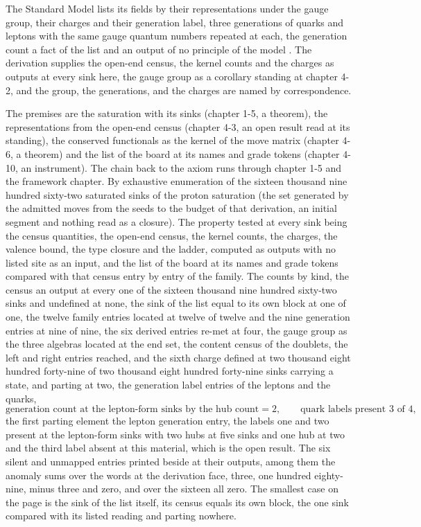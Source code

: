 \begin{chbridge}
The Standard Model lists its fields by their representations under the gauge group, their charges and their generation label, three generations of quarks and leptons with the same gauge quantum numbers repeated at each, the generation count a fact of the list and an output of no principle of the model \cite{Glashow1961,Kobayashi1973}. The derivation supplies the open-end census, the kernel counts and the charges as outputs at every sink here, the gauge group as a corollary standing at chapter 4-2, and the group, the generations, and the charges are named by correspondence.
\end{chbridge}
\begin{chproof}[census]
The premises are the saturation with its sinks (chapter 1-5, a theorem), the representations from the open-end census (chapter 4-3, an open result read at its standing), the conserved functionals as the kernel of the move matrix (chapter 4-6, a theorem) and the list of the board at its names and grade tokens (chapter 4-10, an instrument). The chain back to the axiom runs through chapter 1-5 and the framework chapter. By exhaustive enumeration of the sixteen thousand nine hundred sixty-two saturated sinks of the proton saturation (the set generated by the admitted moves from the seeds to the budget of that derivation, an initial segment and nothing read as a closure). The property tested at every sink being the census quantities, the open-end census, the kernel counts, the charges, the valence bound, the type closure and the ladder, computed as outputs with no listed site as an input, and the list of the board at its names and grade tokens compared with that census entry by entry of the family. The counts by kind, the census an output at every one of the sixteen thousand nine hundred sixty-two sinks and undefined at none, the sink of the list equal to its own block at one of one, the twelve family entries located at twelve of twelve and the nine generation entries at nine of nine, the six derived entries re-met at four, the gauge group as the three algebras located at the end set, the content census of the doublets, the left and right entries reached, and the sixth charge defined at two thousand eight hundred forty-nine of two thousand eight hundred forty-nine sinks carrying a state, and parting at two, the generation label entries of the leptons and the quarks,
\begin{equation}
\text{generation count at the lepton-form sinks by the hub count} = 2,\qquad \text{quark labels present } 3 \text{ of } 4 ,
\end{equation}
the first parting element the lepton generation entry, the labels one and two present at the lepton-form sinks with two hubs at five sinks and one hub at two and the third label absent at this material, which is the open result. The six silent and unmapped entries printed beside at their outputs, among them the anomaly sums over the words at the derivation face, three, one hundred eighty-nine, minus three and zero, and over the sixteen all zero. The smallest case on the page is the sink of the list itself, its census equals its own block, the one sink compared with its listed reading and parting nowhere.


\end{chproof}
